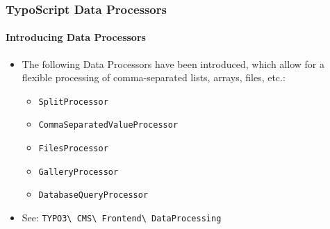 %

\begin{frame}[fragile]
	\frametitle{TypoScript Data Processors}
	\framesubtitle{Introducing Data Processors}

	\lstset{basicstyle=\tiny\ttfamily}

	\begin{itemize}

		\item The following Data Processors have been introduced, which allow for a flexible processing
			of comma-separated lists, arrays, files, etc.:

			\begin{itemize}
				\item \texttt{SplitProcessor}
				\item \texttt{CommaSeparatedValueProcessor}
				\item \texttt{FilesProcessor}
				\item \texttt{GalleryProcessor}
				\item \texttt{DatabaseQueryProcessor}
			\end{itemize}

		\item See:
			\texttt{TYPO3\textbackslash
				CMS\textbackslash
				Frontend\textbackslash
				DataProcessing}

	\end{itemize}

\end{frame}


